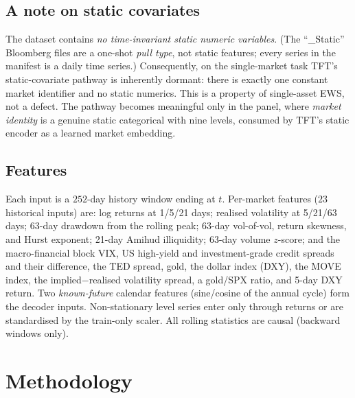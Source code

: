 \documentclass[11pt,a4paper]{article}
\begin{document}
\subsection{A note on static covariates}
The dataset contains \emph{no time-invariant static numeric variables}. (The
``\_Static'' Bloomberg files are a one-shot \emph{pull type}, not static
features; every series in the manifest is a daily time series.) Consequently,
on the single-market task TFT's static-covariate pathway is inherently
dormant: there is exactly one constant market identifier and no static
numerics. This is a property of single-asset EWS, not a defect. The pathway
becomes meaningful only in the panel, where \emph{market identity} is a
genuine static categorical with nine levels, consumed by TFT's static encoder
as a learned market embedding.

\subsection{Features}
Each input is a $252$-day history window ending at $t$. Per-market features
($23$ historical inputs) are: log returns at 1/5/21 days; realised volatility
at 5/21/63 days; 63-day drawdown from the rolling peak; 63-day vol-of-vol,
return skewness, and Hurst exponent; 21-day Amihud illiquidity; 63-day volume
$z$-score; and the macro-financial block VIX, US high-yield and
investment-grade credit spreads and their difference, the TED spread, gold,
the dollar index (DXY), the MOVE index, the implied$-$realised volatility
spread, a gold/SPX ratio, and 5-day DXY return. Two \emph{known-future}
calendar features (sine/cosine of the annual cycle) form the decoder inputs.
Non-stationary level series enter only through returns or are standardised by
the train-only scaler. All rolling statistics are causal (backward windows
only).

\section{Methodology}
\label{sec:method}
\end{document}
